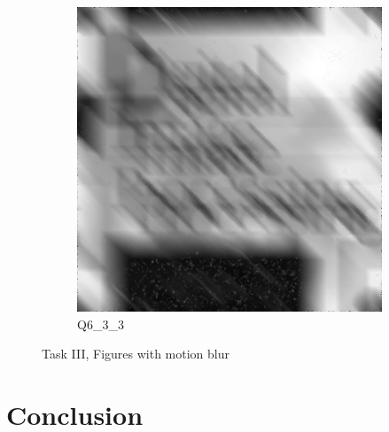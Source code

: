 \documentclass[
	12pt, %
]{style/fphw}
\begin{document}
\begin{problem}
\begin{figure}[H]
\begin{subfigure}[b]{.3\textwidth}
			\includegraphics[width=0.9\linewidth]{Q6_3_3.png}
			\caption{Q6\_3\_3}
			\label{Q6_3_3}
		\end{subfigure}
		\caption{Task III, Figures with motion blur}
    	\label{Task III, Figures with motion blur}	
	\end{figure}

\end{problem}


\section*{Conclusion}
\end{document}

